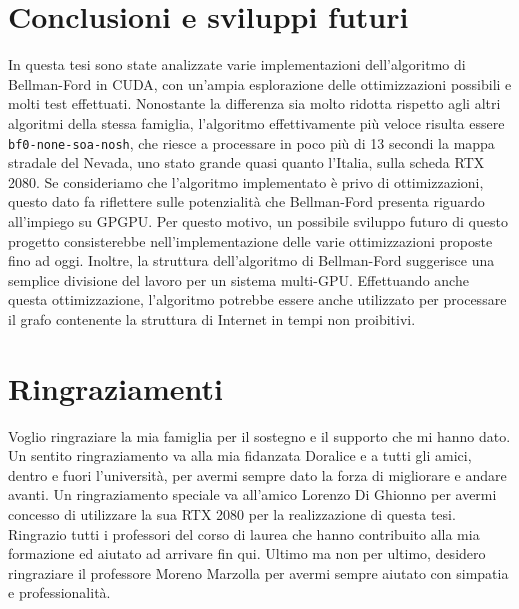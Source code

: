 \documentclass[12pt,a4paper,oneside]{book}
\begin{document}
	\chapter*{Conclusioni e sviluppi futuri}
	In questa tesi sono state analizzate varie implementazioni dell'algoritmo di Bellman-Ford in CUDA, con un'ampia esplorazione delle ottimizzazioni possibili e molti test effettuati. Nonostante la differenza sia molto ridotta rispetto agli altri algoritmi della stessa famiglia, l'algoritmo effettivamente più veloce risulta essere \texttt{bf0-none-soa-nosh}, che riesce a processare in poco più di 13 secondi la mappa stradale del Nevada, uno stato grande quasi quanto l'Italia, sulla scheda RTX 2080. Se consideriamo che l'algoritmo implementato è privo di ottimizzazioni, questo dato fa riflettere sulle potenzialità che Bellman-Ford presenta riguardo all'impiego su GPGPU. Per questo motivo, un possibile sviluppo futuro di questo progetto consisterebbe nell'implementazione delle varie ottimizzazioni proposte fino ad oggi. Inoltre, la struttura dell'algoritmo di Bellman-Ford suggerisce una semplice divisione del lavoro per un sistema multi-GPU. Effettuando anche questa ottimizzazione, l'algoritmo potrebbe essere anche utilizzato per processare il grafo contenente la struttura di Internet in tempi non proibitivi.
	
	\printbibliography
	
	\chapter*{Ringraziamenti}
	Voglio ringraziare la mia famiglia per il sostegno e il supporto che mi hanno dato. Un sentito ringraziamento va alla mia fidanzata Doralice e a tutti gli amici, dentro e fuori l'università, per avermi sempre dato la forza di migliorare e andare avanti. Un ringraziamento speciale va all'amico Lorenzo Di Ghionno per avermi concesso di utilizzare la sua RTX 2080 per la realizzazione di questa tesi. Ringrazio tutti i professori del corso di laurea che hanno contribuito alla mia formazione ed aiutato ad arrivare fin qui. Ultimo ma non per ultimo, desidero ringraziare il professore Moreno Marzolla per avermi sempre aiutato con simpatia e professionalità.
	
\end{document}
